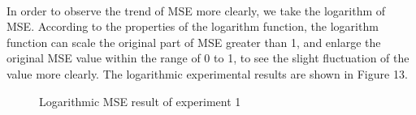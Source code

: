 \documentclass[11pt,a4paper]{article}
\begin{document}
\\
\newline
In order to observe the trend of MSE more clearly, we take the logarithm of MSE. According to the properties of the logarithm function, the logarithm function can scale the original part of MSE greater than 1, and enlarge the original MSE value within the range of 0 to 1, to see the slight fluctuation of the value more clearly. The logarithmic experimental results are shown in Figure 13.
\\
\begin{figure}[ht!]
\centering
{}
\quad
{}
\quad
{}
\quad
{}
\caption{Logarithmic MSE result of experiment 1}
\label{fig: Logarithmic MSE result of experiment 1}
\end{figure}
\end{document}
